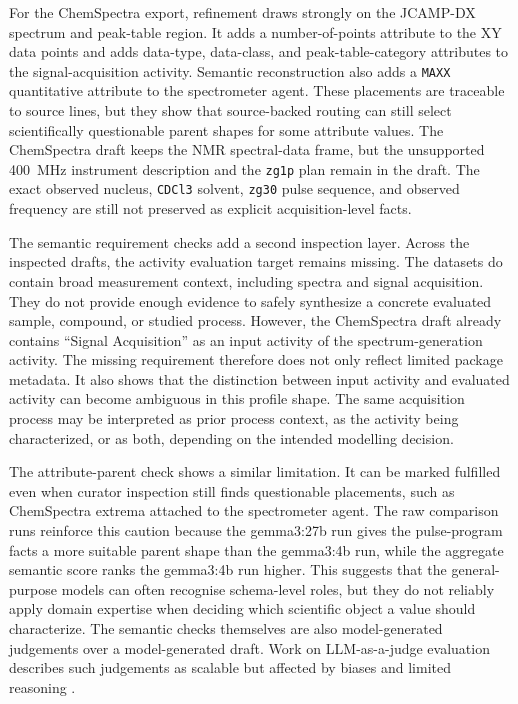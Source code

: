 For the ChemSpectra export, refinement draws strongly on the \ac{JCAMP-DX} spectrum and peak-table region.
It adds a number-of-points attribute to the XY data points and adds data-type, data-class, and peak-table-category attributes to the signal-acquisition activity.
Semantic reconstruction also adds a \texttt{MAXX} quantitative attribute to the spectrometer agent.
These placements are traceable to source lines, but they show that source-backed routing can still select scientifically questionable parent shapes for some attribute values.
The ChemSpectra draft keeps the \ac{NMR} spectral-data frame, but the unsupported 400~MHz instrument description and the \texttt{zg1p} plan remain in the draft.
The exact observed nucleus, \texttt{CDCl3} solvent, \texttt{zg30} pulse sequence, and observed frequency are still not preserved as explicit acquisition-level facts.

The semantic requirement checks add a second inspection layer.
Across the inspected drafts, the activity evaluation target remains missing.
The datasets do contain broad measurement context, including spectra and signal acquisition.
They do not provide enough evidence to safely synthesize a concrete evaluated sample, compound, or studied process.
However, the ChemSpectra draft already contains \enquote{Signal Acquisition} as an input activity of the spectrum-generation activity.
The missing requirement therefore does not only reflect limited package metadata.
It also shows that the distinction between input activity and evaluated activity can become ambiguous in this profile shape.
The same acquisition process may be interpreted as prior process context, as the activity being characterized, or as both, depending on the intended modelling decision.

The attribute-parent check shows a similar limitation.
It can be marked fulfilled even when curator inspection still finds questionable placements, such as ChemSpectra extrema attached to the spectrometer agent.
The raw comparison runs reinforce this caution because the gemma3:27b run gives the pulse-program facts a more suitable parent shape than the gemma3:4b run, while the aggregate semantic score ranks the gemma3:4b run higher.
This suggests that the general-purpose models can often recognise schema-level roles, but they do not reliably apply domain expertise when deciding which scientific object a value should characterize.
The semantic checks themselves are also model-generated judgements over a model-generated draft.
Work on \ac{LLM}-as-a-judge evaluation describes such judgements as scalable but affected by biases and limited reasoning \cite{zheng2023llmjudge}.

